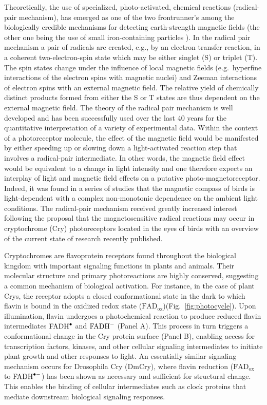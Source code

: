 \documentclass[twoside,twocolumn,9pt]{article}
\begin{document}
Theoretically, the use of specialized, photo-activated, chemical reactions (radical-pair mechanism), has emerged as one of the two 
frontrunner's among the biologically credible mechanisms for detecting earth-strength magnetic fields (the other one being the use 
of small iron-containing particles \cite{Kirschvink1981}). In the radical pair mechanism \cite{Schulten1978} a pair of radicals 
are created, e.g., by an electron transfer reaction, in a coherent two-electron-spin state which may be either singlet (S) or 
triplet (T). The spin states change under the influence of local magnetic fields (e.g.\ hyperfine interactions of the electron 
spins with magnetic nuclei) and Zeeman interactions of electron spins with an external magnetic field. The relative yield of 
chemically distinct products formed from either the S or T states are thus dependent on the external magnetic field. The theory of 
the radical pair mechanism is well developed and has been successfully used over the last 40 years for the quantitative 
interpretation of a variety of experimental data. Within the context of a photoreceptor molecule, the effect of the magnetic field 
would be manifested by either speeding up or slowing down a light-activated reaction step that involves a radical-pair 
intermediate. In other words, the magnetic field effect would be equivalent to a change in light intensity and one therefore 
expects an interplay of light and magnetic field effects on a putative photo-magnetoreceptor. Indeed, it was found in a series of 
studies that the magnetic compass of birds is light-dependent with a complex non-monotonic dependence on the ambient light 
conditions. \cite{Johnsen2007, Wiltschko2016, Wiltschko2008} The radical-pair mechanism received greatly increased interest 
following the proposal that the magnetosensitive radical reactions may occur in cryptochrome (Cry) photoreceptors located in the 
eyes of birds \cite{Ritz2000} with an overview of the current state of research recently published. \cite{Hore2016} 

Cryptochromes are flavoprotein receptors found throughout the biological kingdom with important signaling functions in plants and animals. \cite{Chaves2011} Their molecular structure and primary photoreactions are highly conserved, suggesting a common mechanism of biological activation. For instance, in the case of plant Crys, the receptor adopts a closed conformational state in the dark to which flavin is bound in the oxidized redox state ($\text{FAD}_{\text{ox}}$)(Fig.~\ref{fig:photocycle}). \cite{Ahmad2016} Upon illumination, flavin undergoes a photochemical reaction to produce reduced flavin intermediates $\ce{FADH^{.}}$ and $\ce{FADH^{-}}$ (Panel A). This process in turn triggers a conformational change in the Cry protein surface (Panel B), enabling access for transcription factors, kinases, and other cellular signaling intermediates to initiate plant growth and other responses to light. An essentially similar signaling mechanism occurs for Drosophila Cry (DmCry), where flavin reduction ($\text{FAD}_{\text{ox}}$ to $\ce{FADH^{.-}}$) has been shown as necessary and sufficient for structural change. This enables the binding of cellular intermediates such as clock proteins that mediate downstream biological signaling responses. \cite{Vaidya2013}
\end{document}
